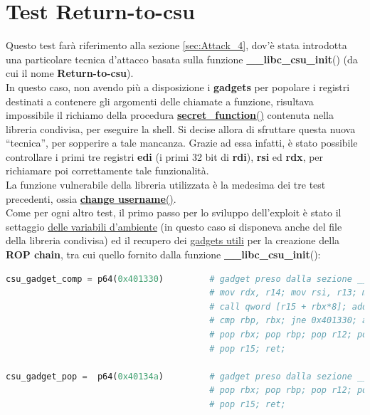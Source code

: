 \section{Test Return-to-csu}
\label{sec:Test_4}
Questo test farà riferimento alla sezione \ref{sec:Attack_4}, dov'è stata introdotta una particolare tecnica d'attacco basata sulla funzione \textbf{\_\_libc\_csu\_init}() (da cui il nome \textbf{Return-to-csu}).\\
In questo caso, non avendo più a disposizione i \textbf{gadgets} per popolare i registri destinati a contenere gli argomenti delle chiamate a funzione, risultava impossibile il richiamo della procedura \hyperref[secret function]{\textbf{secret\_function}()} contenuta nella libreria condivisa, per eseguire la shell.
Si decise allora di sfruttare questa nuova ``tecnica'', per sopperire a tale mancanza. Grazie ad essa infatti, è stato possibile controllare i primi tre registri \textbf{edi} (i primi 32 bit di \textbf{rdi}), \textbf{rsi} ed \textbf{rdx}, per richiamare poi correttamente tale funzionalità.\\
La funzione vulnerabile della libreria utilizzata è la medesima dei tre test precedenti, ossia \hyperref[change username]{\textbf{change username}()}.\\
Come per ogni altro test, il primo passo per lo sviluppo dell'exploit è stato il settaggio \hyperref[env]{delle variabili d'ambiente} (in questo caso si disponeva anche del file della libreria condivisa) ed il recupero dei \hyperref[gadgets]{gadgets utili} per la creazione della \textbf{ROP chain}, tra cui quello fornito dalla funzione  
\textbf{\_\_libc\_csu\_init}():
\begin{lstlisting}[language=Python, label=gadgets add, caption={\textbf{Gadgets} recuperati dalle istruzioni che compongono \textbf{\_\_libc\_csu\_init}().}, style =Python]
csu_gadget_comp = p64(0x401330)         # gadget preso dalla sezione __libc_csu_init. 
                                        # mov rdx, r14; mov rsi, r13; mov edi, r12d; 
                                        # call qword [r15 + rbx*8]; add rbx, 1; 
                                        # cmp rbp, rbx; jne 0x401330; add rsp, 8;
                                        # pop rbx; pop rbp; pop r12; pop r13; pop r14; 
                                        # pop r15; ret;

csu_gadget_pop =  p64(0x40134a)         # gadget preso dalla sezione __libc_csu_init
                                        # pop rbx; pop rbp; pop r12; pop r13; pop r14; 
                                        # pop r15; ret;
\end{lstlisting}
